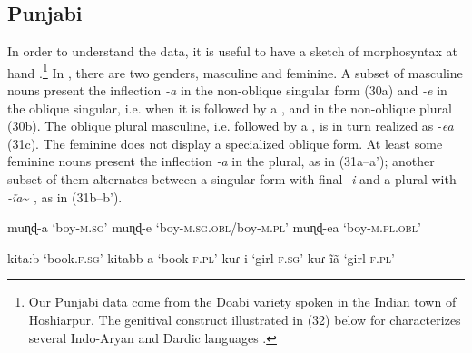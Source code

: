 \documentclass[output=paper]{langsci/langscibook}
\begin{document}
\subsection{Punjabi}%
In order to understand the  data, it is useful to have a sketch of  morphosyntax at hand \citep{Bhatia2000}.{\footnote{Our Punjabi data come from the Doabi variety spoken in the Indian town of Hoshiarpur. The genitival construct illustrated in (32) below for  characterizes several Indo-Aryan and Dardic languages \citep{Payne1995}.}} In , there are two genders, masculine and feminine. A subset of masculine nouns present the inflection \textit{{}-a} in the non-oblique singular form (30a) and \textit{{}-e} in the oblique singular, i.e. when it is followed by a , and in the non-oblique plural (30b). The oblique plural masculine, i.e. followed by a , is in turn realized as -\textit{ea} (31c). The feminine does not display a specialized oblique form. At least some feminine nouns present the inflection \textit{{}-a} in the plural, as in (31a--a’); another subset of them alternates between a singular form with final \textit{{}-i} and a plural with \textit{{}-ĩa}\~{} , as in (31b--b’). 

\ea%
    \label{ex:manzini:30}
    \ea muɳɖ-a
        \glt ‘boy-\textsc{m.sg}’
    \ex muɳɖ-e
        \glt ‘boy-\textsc{m.sg.obl}/boy-\textsc{m.pl}’  
    \ex muɳɖ-ea
        \glt ‘boy-\textsc{m.pl.obl}’
\z
\z

\ea%
    \label{ex:manzini:31}
        \begin{xlista}
        \ex  kita:b        
        \glt ‘book.\textsc{f.sg}’
         kitabb-a      
        \glt      ‘book-\textsc{f.pl}’ 
        \ex   kuɾ-i         
        \glt  ‘girl-\textsc{f.sg}’
          kuɾ-ĩã         
        \glt      ‘girl-\textsc{f.pl}’
        \end{xlista}
\z
\end{document}
